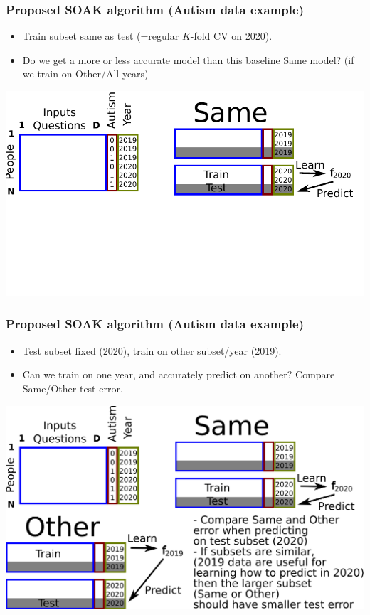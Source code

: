\documentclass[t]{beamer}
\begin{document}
\begin{frame}
  \frametitle{Proposed SOAK algorithm (Autism data example)}
  \begin{itemize}
  \item Train subset same as test (=regular $K$-fold CV on 2020).
    \item Do we get a more or less accurate model than this baseline Same model? (if we train on Other/All years)
  \end{itemize}
  \includegraphics[width=\textwidth]{drawing-cv-same-other-years-2.pdf}
\end{frame}

\begin{frame}
  \frametitle{Proposed SOAK algorithm (Autism data example)}
  \begin{itemize}
  \item Test subset fixed (2020), train on other subset/year (2019).
    \item Can we train on one year, and accurately predict on another? Compare Same/Other test error.
  \end{itemize}
  \includegraphics[width=\textwidth]{drawing-cv-same-other-years-ann}
\end{frame}
\end{document}
